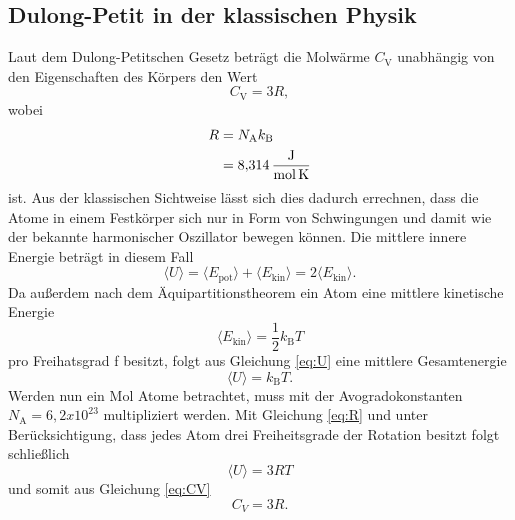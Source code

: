 \subsection{Dulong-Petit in der klassischen Physik}
Laut dem Dulong-Petitschen Gesetz beträgt die Molwärme $C_\text{V}$ unabhängig von den Eigenschaften des Körpers den Wert \[C_\text{V}=3R,\]
wobei \begin{align}
R 	&= N_\text{A} k_\text{B} \label{eq:R}\\
	&= \SI{8,314}{\joule\per\mol\per\kelvin}\notag
\end{align} ist.
Aus der klassischen Sichtweise lässt sich dies dadurch errechnen, dass die Atome in einem Festkörper sich nur in Form 
von Schwingungen und damit wie der bekannte harmonischer Oszillator bewegen können.
Die mittlere innere Energie beträgt in diesem Fall
\begin{equation}
\langle U \rangle = \langle E_\text{pot} \rangle + \langle E_\text{kin}\rangle= 2 \langle E_\text{kin} \rangle. \label{eq:U}
\end{equation}
Da außerdem nach dem Äquipartitionstheorem ein Atom eine mittlere kinetische Energie
\begin{equation*}
\langle E_\text{kin}\rangle = \frac{1}{2}k_\text{B}T
\end{equation*}
pro Freihatsgrad f besitzt, folgt aus Gleichung \eqref{eq:U} eine mittlere Gesamtenergie
\begin{equation}
\langle U \rangle= k_\text{B}T. \label{eq:U2}
\end{equation}
Werden nun ein Mol Atome betrachtet, muss mit der Avogradokonstanten $N_\text{A} = 6,2 x10^{23}$ multipliziert werden.
Mit Gleichung \eqref{eq:R} und unter Berücksichtigung, dass jedes Atom drei Freiheitsgrade der Rotation besitzt folgt schließlich
\begin{equation}
\langle U \rangle = 3RT \label{eq:U3}
\end{equation}
und somit aus Gleichung \eqref{eq:CV}
\begin{equation}
C_V = 3R. \label{eq:CV2}
\end{equation}
